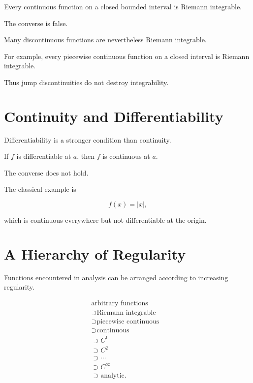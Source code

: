 \documentclass{essay}
\begin{document}
\begin{theorem}

Every continuous function on a closed bounded interval is Riemann integrable.

\end{theorem}

The converse is false.

Many discontinuous functions are nevertheless Riemann integrable.

For example, every piecewise continuous function on a closed interval is
Riemann integrable.

Thus jump discontinuities do not destroy integrability.


\section{Continuity and Differentiability}

Differentiability is a stronger condition than continuity.

\begin{theorem}

If \(f\) is differentiable at \(a\), then \(f\) is continuous at \(a\).

\end{theorem}

The converse does not hold.

The classical example is

\[
f(x)=|x|,
\]

which is continuous everywhere but not differentiable at the origin.


\section{A Hierarchy of Regularity}

Functions encountered in analysis can be arranged according to increasing
regularity.

\[
\begin{aligned}
\text{arbitrary functions}
&\\
\supset
\text{Riemann integrable}
&\\
\supset
\text{piecewise continuous}
&\\
\supset
\text{continuous}
&\\
\supset
C^1
&\\
\supset
C^2
&\\
\supset
\cdots
&\\
\supset
C^\infty
&\\
\supset
\text{analytic}.
\end{aligned}
\]
\end{document}
